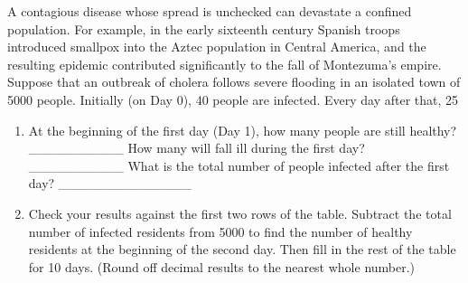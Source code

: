 \documentclass[10pt,]{book}
\theoremstyle{plain}
\theoremstyle{definition}
\theoremstyle{definition}
\numberwithin{equation}{section}
\newcommand{\hrulethin}  {\noalign{\hrule height 0.04em}}
\newcommand{\hrulethick} {\noalign{\hrule height 0.11em}}
\newcounter{figstack}
\newlength\fight
\newcommand\pushValignCaptionBottom[5][b]{%
\stepcounter{figstack}%
\expandafter\def\csname %
figalign\romannumeral\value{figstack}\endcsname{#1}%
\expandafter\def\csname %
figtype\romannumeral\value{figstack}\endcsname{#2}%
\expandafter\def\csname %
figwd\romannumeral\value{figstack}\endcsname{#3}%
\expandafter\def\csname %
figcontent\romannumeral\value{figstack}\endcsname{#4}%
\expandafter\def\csname %
figcap\romannumeral\value{figstack}\endcsname{#5}%
\setbox0=\hbox{%
\begin{#2}{#3}#4\end{#2}}%
\ifdim\dimexpr\ht0+\dp0\relax>\fight\global\setlength{\fight}{%
\dimexpr\ht0+\dp0\relax}\fi%
}
\begin{document}
            A contagious disease whose spread is unchecked can devastate a confined population. For example, in the early sixteenth century Spanish troops introduced smallpox into the Aztec population in Central America, and the resulting epidemic contributed significantly to the fall of Montezuma’s empire. Suppose that an outbreak of cholera follows severe flooding in an isolated town of 5000 people. Initially (on Day 0), 40 people are infected. Every day after that, 25%
\leavevmode%
\begin{enumerate}
\item\hypertarget{li-218}{}At the beginning of the first day (Day 1), how many people are still healthy? __________ How many will fall ill during the first day? __________ What is the total number of people infected after the first day? ______________ 
\item\hypertarget{li-219}{}Check your results against the first two rows of the table. Subtract the total number of infected residents from 5000 to find the number of healthy residents at the beginning of the second day. Then fill in the rest of the table for 10 days. (Round off decimal results to the nearest whole number.)
\leavevmode%
\end{enumerate}
\end{document}
